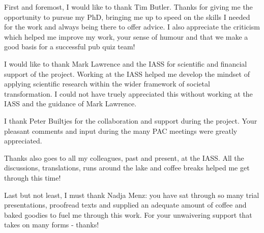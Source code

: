 First and foremost, I would like to thank Tim Butler. 
Thanks for giving me the opportunity to pursue my PhD, bringing me up to speed on the skills I needed for the work and always being there to offer advice. 
I also appreciate the criticism which helped me improve my work, your sense of humour and that we make a good basis for a successful pub quiz team!

I would like to thank Mark Lawrence and the IASS for scientific and financial support of the project.
Working at the IASS helped me develop the mindset of applying scientific research within the wider framework of societal transformation. 
I could not have truely appreciated this without working at the IASS and the guidance of Mark Lawrence.

I thank Peter Builtjes for the collaboration and support during the project.
Your pleasant comments and input during the many PAC meetings were greatly appreciated.

Thanks also goes to all my colleagues, past and present, at the IASS.
All the discussions, translations, runs around the lake and coffee breaks helped me get through this time!

Last but not least, I must thank Nadja Menz: you have sat through so many trial presentations, proofread texts and supplied an adequate amount of coffee and baked goodies to fuel me through this work. 
For your unwaivering support that takes on many forms - thanks!
